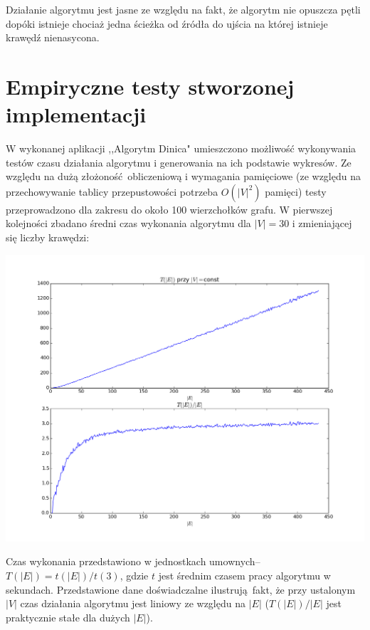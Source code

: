 \documentclass{article}
\begin{document}
Działanie algorytmu jest jasne ze względu na fakt, że algorytm nie opuszcza pętli dopóki istnieje chociaż jedna ścieżka od źródła do ujścia na której istnieje krawędź nienasycona. 
\section{Empiryczne testy stworzonej implementacji}
W wykonanej aplikacji ,,Algorytm Dinica" umieszczono możliwość wykonywania testów czasu działania algorytmu i generowania na ich podstawie wykresów. Ze względu na dużą złożoność obliczeniową i wymagania pamięciowe (ze względu na przechowywanie tablicy przepustowości potrzeba $O(|V|^2)$ pamięci) testy przeprowadzono dla zakresu do około 100 wierzchołków grafu. W pierwszej kolejności zbadano średni czas wykonania algorytmu dla $|V|=30$ i zmieniającej się liczby krawędzi:
\begin{center}
\includegraphics[scale=0.55]{constv.png}
\end{center}
Czas wykonania przedstawiono w jednostkach umownych--$T(|E|) = t(|E|)/t(3)$, gdzie $t$ jest średnim czasem pracy algorytmu w sekundach. Przedstawione dane doświadczalne ilustrują fakt, że przy ustalonym $|V|$ czas działania algorytmu jest liniowy ze względu na $|E|$ ($T(|E|)/|E|$ jest praktycznie stałe dla dużych $|E|$).
\end{document}
